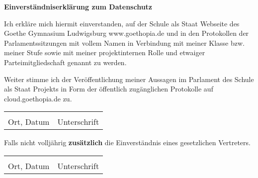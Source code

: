 \documentclass[14pt]{article}
\begin{document}
\textbf{\LARGE{Einverständniserklärung zum Datenschutz}}

\vspace{0.5cm}

Ich erkläre mich hiermit einverstanden, auf der Schule als Staat Webseite des Goethe Gymnasium
Ludwigsburg www.goethopia.de und
in den Protokollen der Parlamentssitzungen mit vollem Namen in
Verbindung mit meiner Klasse bzw. meiner Stufe sowie mit meiner projektinternen Rolle und etwaiger
Parteimitgliedschaft genannt zu werden.

Weiter stimme ich der Veröffentlichung meiner Aussagen im Parlament des Schule als Staat Projekts
in Form der öffentlich zugänglichen Protokolle auf cloud.goethopia.de zu.

\vspace{10mm}
\begin{tabular}{p{9cm}p{9cm}}
    \dotfill & \dotfill \\
    Ort, Datum & Unterschrift \\
\end{tabular}

\vspace{10mm}
Falls nicht volljährig \textbf{zusätzlich} die Einverständnis eines gesetzlichen Vertreters.
\vspace{5mm}

\begin{tabular}{p{9cm}p{9cm}}
    \dotfill & \dotfill \\
    Ort, Datum & Unterschrift \\
\end{tabular}
\end{document}

